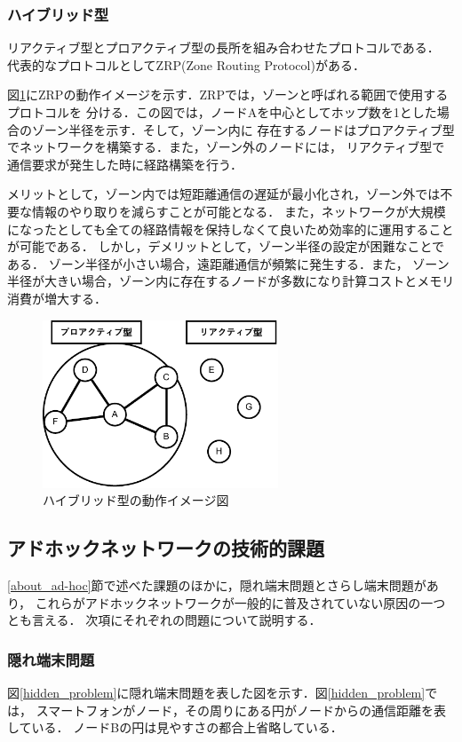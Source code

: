 \documentclass[a4paper, 11pt]{ltjsarticle}
\begin{document}
\subsubsection{ハイブリッド型}
リアクティブ型とプロアクティブ型の長所を組み合わせたプロトコルである．
代表的なプロトコルとしてZRP(Zone Routing Protocol)\cite{1574231874891177344}がある．

図\ref{hybrid_model}にZRPの動作イメージを示す．ZRPでは，ゾーンと呼ばれる範囲で使用するプロトコルを
分ける．この図では，ノードAを中心としてホップ数を1とした場合のゾーン半径を示す．そして，ゾーン内に
存在するノードはプロアクティブ型でネットワークを構築する．また，ゾーン外のノードには，
リアクティブ型で通信要求が発生した時に経路構築を行う．

メリットとして，ゾーン内では短距離通信の遅延が最小化され，ゾーン外では不要な情報のやり取りを減らすことが可能となる．
また，ネットワークが大規模になったとしても全ての経路情報を保持しなくて良いため効率的に運用することが可能である．
しかし，デメリットとして，ゾーン半径の設定が困難なことである．
ゾーン半径が小さい場合，遠距離通信が頻繁に発生する．また，
ゾーン半径が大きい場合，ゾーン内に存在するノードが多数になり計算コストとメモリ消費が増大する．

\begin{figure}[h]
  \centering
  \includegraphics[width=70mm]{hybrid_model.pdf}
  \caption{ハイブリッド型の動作イメージ図}
  \label{hybrid_model}
\end{figure}

\subsection{アドホックネットワークの技術的課題}
\ref{about_ad-hoc}節で述べた課題のほかに，隠れ端末問題とさらし端末問題があり，
これらがアドホックネットワークが一般的に普及されていない原因の一つとも言える\cite{松井_進2012KJ00008330022}．
次項にそれぞれの問題について説明する．
\subsubsection{隠れ端末問題}
図\ref{hidden_problem}に隠れ端末問題を表した図を示す．図\ref{hidden_problem}では，
スマートフォンがノード，その周りにある円がノードからの通信距離を表している．
ノードBの円は見やすさの都合上省略している．
\end{document}
